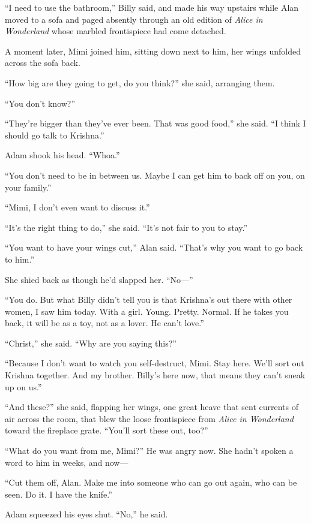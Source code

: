 \documentclass{article}
\begin{document}
``I need to use the bathroom,'' Billy said, and made his way upstairs
while Alan moved to a sofa and paged absently through an old edition
of \textit{Alice in Wonderland} whose marbled frontispiece had come
detached. 

A moment later, Mimi joined him, sitting down next to him, her wings
unfolded across the sofa back.

``How big are they going to get, do you think?'' she said, arranging
them.

``You don't know?''

``They're bigger than they've ever been.  That was good food,'' she
said.  ``I think I should go talk to Krishna.''

Adam shook his head.  ``Whoa.''

``You don't need to be in between us.  Maybe I can get him to back off
on you, on your family.''

``Mimi, I don't even want to discuss it.''

``It's the right thing to do,'' she said.  ``It's not fair to you to
stay.''

``You want to have your wings cut,'' Alan said.  ``That's why you want
to go back to him.''

She shied back as though he'd slapped her.  ``No---''

``You do.  But what Billy didn't tell you is that Krishna's out there
with other women, I saw him today.  With a girl.  Young.  Pretty. 
Normal.  If he takes you back, it will be as a toy, not as a lover. 
He can't love.''

``Christ,'' she said.  ``Why are you saying this?''

``Because I don't want to watch you self-destruct, Mimi.  Stay here. 
We'll sort out Krishna together.  And my brother.  Billy's here now,
that means they can't sneak up on us.''

``And these?'' she said, flapping her wings, one great heave that sent
currents of air across the room, that blew the loose frontispiece from
\textit{Alice in Wonderland} toward the fireplace grate.  ``You'll
sort these out, too?''

``What do you want from me, Mimi?'' He was angry now.  She hadn't
spoken a word to him in weeks, and now---

``Cut them off, Alan.  Make me into someone who can go out again, who
can be seen.  Do it.  I have the knife.''

Adam squeezed his eyes shut.  ``No,'' he said. 
\end{document}
